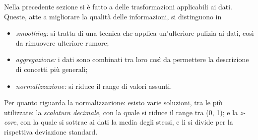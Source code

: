 \documentclass{subfiles}
\begin{document}
Nella precedente sezione si è fatto a delle trasformazioni applicabili ai dati.
Queste, atte a migliorare la qualità delle informazioni, si distinguono in
\begin{itemize}
    \item \emph{smoothing:} si tratta di una tecnica che applica un'ulteriore pulizia ai dati, così da rimuovere ulteriore rumore;
    \item \emph{aggregazione:} i dati sono combinati tra loro così da permettere la descrizione di concetti più generali;
    \item \emph{normalizzazione:} si riduce il range di valori assunti.
\end{itemize}
Per quanto riguarda la normalizzazione: esisto varie soluzioni, tra le più utilizzate: la \emph{scalatura decimale}, con la quale si riduce il range tra (0, 1);
e la \emph{z-core}, con la quale si sottrae ai dati la media degli stessi, e li si divide per la rispettiva deviazione standard.
\end{document}
